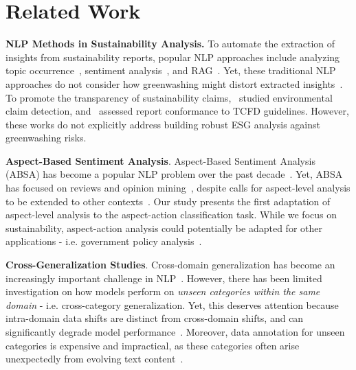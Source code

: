\section{Related Work}
\noindent\textbf{NLP Methods in Sustainability Analysis.}
To automate the extraction of insights from sustainability reports, popular NLP approaches include analyzing topic occurrence~\cite{ong2025esgsenticnet}, sentiment analysis~\cite{song2018sentimentanalysissustainable}, and RAG~\cite{esgrevealrag}. Yet, these traditional NLP approaches do not consider how greenwashing might distort extracted insights~\cite{ong2024explainable}. To promote the transparency of sustainability claims,~\citet{stammbach2022environmental} studied environmental claim detection, and~\citet{ni2023chatreport} assessed report conformance to TCFD guidelines. However, these works do not explicitly address building robust ESG analysis against greenwashing risks.


\noindent\textbf{Aspect-Based Sentiment Analysis}.
Aspect-Based Sentiment Analysis (ABSA) has become a popular NLP problem over the past decade~\cite{duuinc,ong2023finxabsa}. Yet, ABSA has focused on reviews and opinion mining~\cite{heemet}, despite calls for aspect-level analysis to be extended to other contexts~\cite{chebolu2023review}. Our study presents the first adaptation of aspect-level analysis to the aspect-action classification task. While we focus on sustainability, aspect-action analysis could potentially be adapted for other applications - i.e. government policy analysis~\cite{howlett2015policyanalysis}. 

\noindent \textbf{Cross-Generalization Studies}. Cross-domain generalization has become an increasingly important challenge in NLP~\cite{wang2022generalizingstudy}. However, there has been limited investigation on how models perform on \textit{unseen categories within the same domain} - i.e. cross-category generalization. Yet, this deserves attention because intra-domain data shifts are distinct from cross-domain shifts, and can significantly degrade model performance~\cite{subbaswamy2021intradomainshift}. Moreover, data annotation for unseen categories is expensive and impractical, as these categories often arise unexpectedly from evolving text content~\cite{bai2024bvsp}. 


